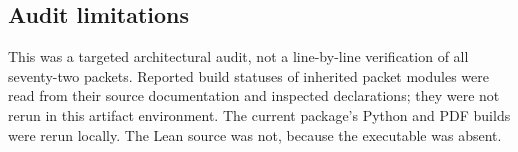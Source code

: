 \subsection{Audit limitations}

This was a targeted architectural audit, not a line-by-line verification of
all seventy-two packets.  Reported build statuses of inherited packet modules
were read from their source documentation and inspected declarations; they
were not rerun in this artifact environment.  The current package's Python and
PDF builds were rerun locally.  The Lean source was not, because the executable
was absent.
